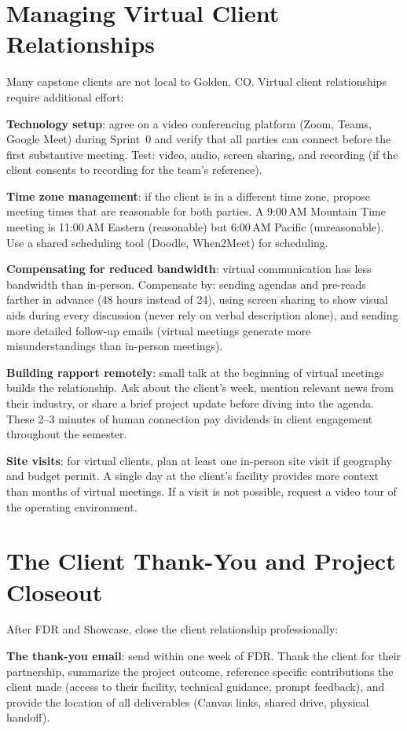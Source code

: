 \section{Managing Virtual Client Relationships}
Many capstone clients are not local to Golden, CO. Virtual client relationships require additional effort:

\textbf{Technology setup}: agree on a video conferencing platform (Zoom, Teams, Google Meet) during Sprint~0 and verify that all parties can connect before the first substantive meeting. Test: video, audio, screen sharing, and recording (if the client consents to recording for the team's reference).

\textbf{Time zone management}: if the client is in a different time zone, propose meeting times that are reasonable for both parties. A 9:00\,AM Mountain Time meeting is 11:00\,AM Eastern (reasonable) but 6:00\,AM Pacific (unreasonable). Use a shared scheduling tool (Doodle, When2Meet) for scheduling.

\textbf{Compensating for reduced bandwidth}: virtual communication has less bandwidth than in-person. Compensate by: sending agendas and pre-reads farther in advance (48 hours instead of 24), using screen sharing to show visual aids during every discussion (never rely on verbal description alone), and sending more detailed follow-up emails (virtual meetings generate more misunderstandings than in-person meetings).

\textbf{Building rapport remotely}: small talk at the beginning of virtual meetings builds the relationship. Ask about the client's week, mention relevant news from their industry, or share a brief project update before diving into the agenda. These 2--3 minutes of human connection pay dividends in client engagement throughout the semester.

\textbf{Site visits}: for virtual clients, plan at least one in-person site visit if geography and budget permit. A single day at the client's facility provides more context than months of virtual meetings. If a visit is not possible, request a video tour of the operating environment.



\section{The Client Thank-You and Project Closeout}
After FDR and Showcase, close the client relationship professionally:

\textbf{The thank-you email}: send within one week of FDR. Thank the client for their partnership, summarize the project outcome, reference specific contributions the client made (access to their facility, technical guidance, prompt feedback), and provide the location of all deliverables (Canvas links, shared drive, physical handoff).


